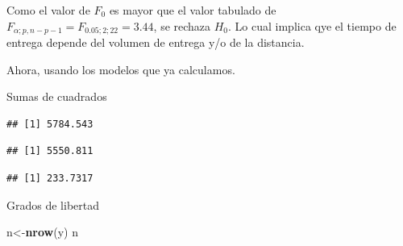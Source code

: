 \documentclass[
]{book}
\newenvironment{Shaded}{\begin{snugshade}}{\end{snugshade}}
\newcommand{\DecValTok}[1]{\textcolor[rgb]{0.00,0.00,0.81}{#1}}
\newcommand{\FunctionTok}[1]{\textcolor[rgb]{0.13,0.29,0.53}{\textbf{#1}}}
\newcommand{\NormalTok}[1]{#1}
\newcommand{\OtherTok}[1]{\textcolor[rgb]{0.56,0.35,0.01}{#1}}
\newcommand{\SpecialCharTok}[1]{\textcolor[rgb]{0.81,0.36,0.00}{\textbf{#1}}}
\begin{document}
Como el valor de \(F_0\) es mayor que el valor tabulado de \(F_{\alpha;p,n-p-1}=F_{0.05;2;22}=3.44\), se rechaza \(H_0\). Lo cual implica qye el tiempo de entrega depende del volumen de entrega y/o de la distancia.

Ahora, usando los modelos que ya calculamos.

Sumas de cuadrados

\begin{Shaded}
\end{Shaded}

\begin{verbatim}
## [1] 5784.543
\end{verbatim}

\begin{Shaded}
\end{Shaded}

\begin{verbatim}
## [1] 5550.811
\end{verbatim}

\begin{Shaded}
\end{Shaded}

\begin{verbatim}
## [1] 233.7317
\end{verbatim}

Grados de libertad

\begin{Shaded}
\begin{Highlighting}[]
\NormalTok{n}\OtherTok{\textless{}{-}}\FunctionTok{nrow}\NormalTok{(y)}
\NormalTok{n}
\end{Highlighting}
\end{Shaded}
\end{document}
